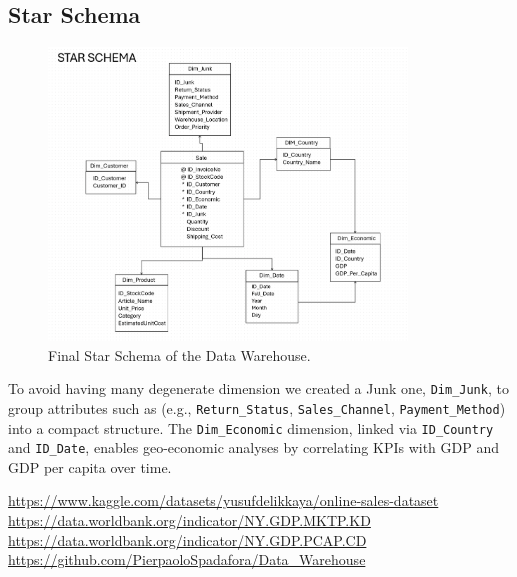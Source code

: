 \documentclass[a4paper,11pt]{article}
\begin{document}
\subsection{Star Schema}
\begin{figure}[H]
\centering
\includegraphics[width=0.85\textwidth]{../Graphs/5_Star_Schema.png}
\caption{Final Star Schema of the Data Warehouse.}
\label{fig:star_schema}
\end{figure}

To avoid having many degenerate dimension we created a Junk one, \texttt{Dim\_Junk}, to group attributes such as (e.g., \texttt{Return\_Status}, \texttt{Sales\_Channel}, \texttt{Payment\_Method}) into a compact structure.
The \texttt{Dim\_Economic} dimension, linked via \texttt{ID\_Country} and \texttt{ID\_Date}, enables geo-economic analyses by correlating KPIs with GDP and GDP per capita over time.


\begin{thebibliography}{99}
 \url{https://www.kaggle.com/datasets/yusufdelikkaya/online-sales-dataset}
 \url{https://data.worldbank.org/indicator/NY.GDP.MKTP.KD}
 \url{https://data.worldbank.org/indicator/NY.GDP.PCAP.CD}
 \url{https://github.com/PierpaoloSpadafora/Data_Warehouse}
\end{thebibliography}
\end{document}
